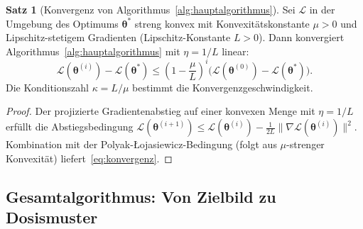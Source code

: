 ﻿\documentclass[a4paper,12pt]{article}
\theoremstyle{definition}
\newtheorem{satz}{Satz}[section]
\newcommand{\vect}[1]{\bm{#1}}
\begin{document}
	\begin{satz}[Konvergenz von Algorithmus~\ref{alg:hauptalgorithmus}]
		\label{satz:hauptkonvergenz}
		Sei $\mathcal{L}$ in der Umgebung des Optimums $\vect{\theta}^*$ streng konvex
		mit Konvexitätskonstante $\mu > 0$ und Lipschitz-stetigem Gradienten
		(Lipschitz-Konstante $L > 0$). Dann konvergiert Algorithmus~\ref{alg:hauptalgorithmus}
		mit $\eta = 1/L$ linear:
		\begin{equation}
			\mathcal{L}(\vect{\theta}^{(i)}) - \mathcal{L}(\vect{\theta}^*)
			\leq \left(1 - \frac{\mu}{L}\right)^i
			\bigl(\mathcal{L}(\vect{\theta}^{(0)}) - \mathcal{L}(\vect{\theta}^*)\bigr).
			\label{eq:konvergenz}
		\end{equation}
		Die Konditionszahl $\kappa = L/\mu$ bestimmt die Konvergenzgeschwindigkeit.
	\end{satz}
	
	\begin{proof}
		Der projizierte Gradientenabstieg auf einer konvexen Menge mit $\eta = 1/L$
		erfüllt die Abstiegsbedingung
		$\mathcal{L}(\vect{\theta}^{(i+1)}) \leq \mathcal{L}(\vect{\theta}^{(i)})
		- \frac{1}{2L}\|\nabla\mathcal{L}(\vect{\theta}^{(i)})\|^2$.
		Kombination mit der Polyak-\L{}ojasiewicz-Bedingung (folgt aus $\mu$-strenger
		Konvexität) liefert~\eqref{eq:konvergenz}.
	\end{proof}
	
	\subsection{Gesamtalgorithmus: Von Zielbild zu Dosismuster}
	
\end{document}
